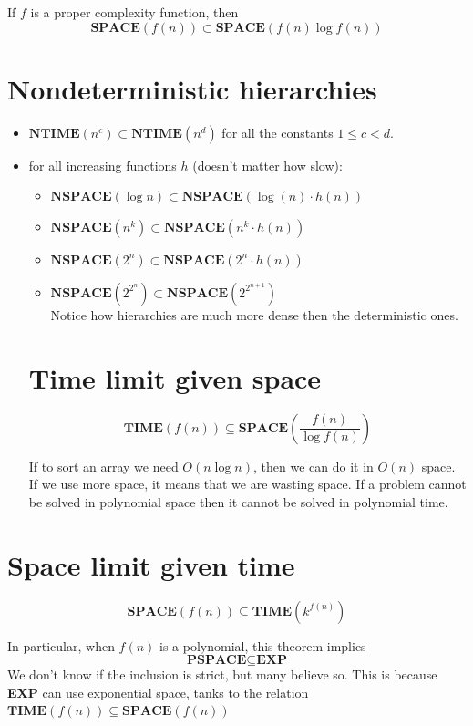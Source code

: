 \documentclass[12pt]{article}
\begin{document}
\begin{defbox}
  If $f$ is a proper complexity function, then $$\textbf{SPACE}(f(n))\subset \textbf{SPACE}(f(n)\log f(n))$$
\end{defbox}

\section{Nondeterministic hierarchies}
\begin{itemize}
  \item $\textbf{NTIME}(n^c)\subset\textbf{NTIME}(n^d)$ for all the constants $1\le c<d$.
  \item for all increasing functions $h$ (doesn't matter how slow):
  \begin{itemize}
    \item $\textbf{NSPACE}(\log n)\subset \textbf{NSPACE}(\log(n)\cdot h(n))$
    \item $\textbf{NSPACE}(n^k)\subset \textbf{NSPACE}(n^k\cdot h(n))$
    \item $\textbf{NSPACE}(2^n)\subset \textbf{NSPACE}(2^n\cdot h(n))$
    \item $\textbf{NSPACE}(2^{2^n})\subset \textbf{NSPACE}(2^{2^{n+1}})$
    \\
    Notice how hierarchies are much more dense then the deterministic ones.
  \end{itemize}

\section{Time limit given space}
\begin{defbox}
  $$\textbf{TIME}(f(n))\subseteq\textbf{SPACE}(\frac{f(n)}{\log f(n)})$$
\end{defbox}
   If to sort an array we need $O(n\log n)$, then we can do it in $O(n)$ space. If we use more space, it means that we are wasting space. If a problem cannot be solved in polynomial space then it cannot be solved in polynomial time.
\end{itemize}

\section{Space limit given time}
\begin{defbox}
  $$\textbf{SPACE}(f(n))\subseteq\textbf{TIME}(k^{f(n)})$$
\end{defbox}
In particular, when $f(n)$ is a polynomial, this theorem implies
$$\textbf{PSPACE}\subseteq\textbf{EXP}$$ 
We don't know if the inclusion is strict, but many believe so. This is because \textbf{EXP} can use exponential space, tanks to the relation $\textbf{TIME}(f(n))\subseteq\textbf{SPACE}(f(n))$
\end{document}
